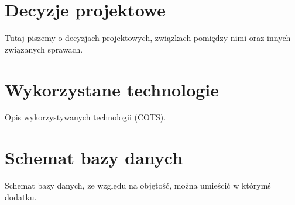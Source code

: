 \section{Decyzje projektowe}
\label{Chapter55}

Tutaj piszemy o decyzjach projektowych, związkach pomiędzy nimi oraz innych związanych sprawach.

\section{Wykorzystane technologie}
\label{Chapter56}

Opis wykorzystywanych technologii (COTS).

\section{Schemat bazy danych}
\label{Chapter57}

Schemat bazy danych, ze względu na objętość, można umieścić w którymś dodatku.